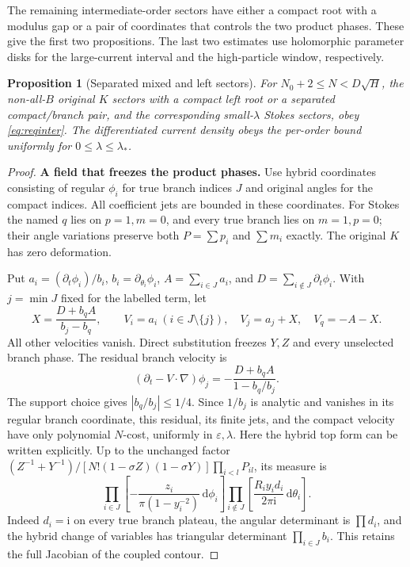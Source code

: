 \documentclass[11pt]{article}
\numberwithin{equation}{section}
\newtheorem{proposition}[theorem]{Proposition}
\theoremstyle{definition}
\newcommand{\dd}{\,\mathrm d}
\newcommand{\ii}{\mathrm i}
\newcommand{\eps}{\varepsilon}
\begin{document}
The remaining intermediate-order sectors have either a compact root
with a modulus gap or a pair of coordinates that controls the two
product phases. These give the first two propositions. The last two
estimates use holomorphic parameter disks for the large-current
interval and the high-particle window, respectively.
\begin{proposition}[Separated mixed and left sectors]\label{prop:mixed}
For \(N_0+2\le N<D\sqrt H\), the non-all-\(B\) original \(K\)
sectors with a compact left root or a separated compact/branch
pair, and the corresponding small-\(\lambda\) Stokes sectors,
obey \eqref{eq:reqinter}. The differentiated current density
obeys the per-order bound uniformly for \(0\le\lambda\le\lambda_*\).
\end{proposition}
\begin{proof}
\noindent\textbf{A field that freezes the product phases.} Use hybrid coordinates consisting of regular \(\phi_i\) for true
branch indices \(J\) and original angles for the compact indices.
All coefficient jets are bounded in these coordinates.
For Stokes the named \(q\) lies on \(p=1,m=0\), and every true
branch lies on \(m=1,p=0\); their angle variations preserve both
\(P=\sum p_i\) and \(\sum m_i\) exactly.
The original \(K\) has zero deformation.

Put \(a_i=(\partial_t\phi_i)/b_i\),
\(b_i=\partial_{\theta_i}\phi_i\),
\(A=\sum_{i\in J}a_i\), and
\(D=\sum_{i\notin J}\partial_t\phi_i\).
With \(j=\min J\) fixed for the labelled term, let
\[
 X=\frac{D+b_qA}{b_j-b_q},\qquad
 V_i=a_i\ (i\in J\setminus\{j\}),\quad
 V_j=a_j+X,\quad V_q=-A-X .
 \]
All other velocities vanish. Direct substitution freezes \(Y,Z\)
and every unselected branch phase. The residual branch velocity is
\[
 (\partial_t-V\cdot\nabla)\phi_j
       =-\frac{D+b_qA}{1-b_q/b_j}.
\]
The support choice gives \(|b_q/b_j|\le1/4\).
Since \(1/b_j\) is analytic and vanishes in its regular branch
coordinate, this residual, its finite jets, and the compact
velocity have only polynomial \(N\)-cost, uniformly in \(\eps,\lambda\).
Here the hybrid top form can be written explicitly. Up to the
unchanged factor \((Z^{-1}+Y^{-1})/[N!(1-\sigma Z)(1-\sigma Y)]\prod_{i<l}P_{il}\),
its measure is
\[
 \prod_{i\in J}\left[-\frac{z_i}{\pi(1-y_i^{-2})}\dd\phi_i\right]
 \prod_{i\notin J}\left[\frac{R_i y_i d_i}{2\pi\ii}\dd\theta_i\right].
\]
Indeed \(d_i=\ii\) on every true branch plateau, the angular
determinant is \(\prod d_i\), and the hybrid change of variables
has triangular determinant \(\prod_{i\in J}b_i\).
This retains the full Jacobian of the coupled contour.


\end{proof}
\end{document}
